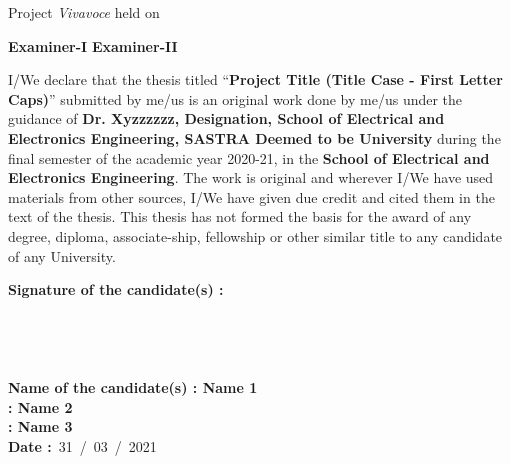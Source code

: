 \documentclass[a4paper, 12pt, oneside]{sastra}
\begin{document}
	\vspace*{0.35in}
	
	\noindent Project \textit{Vivavoce} held on
	
	\vspace*{0.50in}
	\noindent \textbf{Examiner-I} \hspace*{120mm} \textbf{Examiner-II}
	
	
	\declaration
	
	
	\begin{doublespace}
		\linespread{2}
		
		I/We declare that the thesis titled ``\textbf{Project Title (Title Case - First Letter Caps)}'' submitted by me/us is an original work done by me/us under the guidance of \textbf{Dr. Xyzzzzzz, Designation, School of Electrical and Electronics Engineering, SASTRA Deemed to be University} during the final semester of the academic year 2020-21, in the \textbf{School of Electrical and Electronics Engineering}. The work is original and wherever I/We have used materials from other sources, I/We have given due credit and cited them in the text of the thesis. This thesis has not formed the basis for the award of any degree, diploma, associate-ship, fellowship or other similar title to any candidate of any University.\\
		
	\end{doublespace}
	\noindent \textbf{Signature of the candidate(s)	:}	
	\\
	\\
	\\
	\\
	\\
	\noindent\textbf{Name of the candidate(s)\hspace{7mm}		: Name 1}\\
	\hspace*{53mm}\textbf{: Name 2}\\
	\hspace*{53mm}\textbf{: Name 3}\\
	\noindent\textbf{Date\hspace*{43.5mm}					:}~31~/~03~/~2021\\%
	
	\acknowledgements
	
\end{document}
